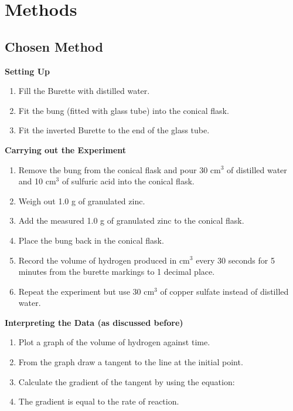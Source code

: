 \section{Methods}

	\subsection{Chosen Method}

\textbf{Setting Up}

\begin{enumerate}
\item Fill the Burette with distilled water.
\item Fit the bung (fitted with glass tube) into the conical flask.
\item Fit the inverted Burette to the end of the glass tube.
\end{enumerate}

\textbf{Carrying out the Experiment}

\begin{enumerate}
\item Remove the bung from the conical flask and pour 30 cm$^3$ of distilled water and 10 cm$^3$ of sulfuric acid into the conical flask.
\item Weigh out 1.0 g of granulated zinc.
\item Add the measured 1.0 g of granulated zinc to the conical flask.
\item Place the bung back in the conical flask.
\item Record the volume of hydrogen produced in cm$^3$ every 30 seconds for 5 minutes from the burette markings to 1 decimal place.
\item Repeat the experiment but use 30 cm$^3$ of copper sulfate instead of distilled water.
\end{enumerate} 

\textbf{Interpreting the Data (as discussed before)}

\begin{enumerate}
\item Plot a graph of the volume of hydrogen against time.
\item From the graph draw a tangent to the line at the initial point.
\item Calculate the gradient of the tangent by using the equation: 
\item The gradient is equal to the rate of reaction.
\end{enumerate}



